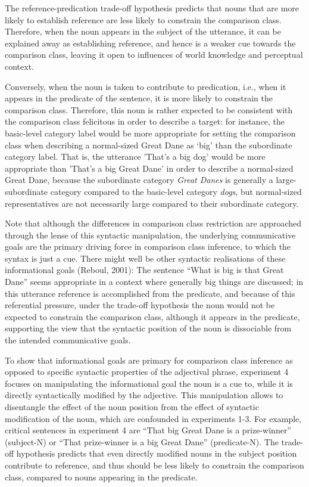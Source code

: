The reference-predication trade-off hypothesis predicts that nouns that are more likely to establish reference are less likely to constrain the comparison class. Therefore, when the noun appears in the subject of the utterance, it can be explained away as establishing reference, and hence is a weaker cue towards the comparison class, leaving it open to influences of world knowledge and perceptual context. 

 Conversely, when the noun is taken to contribute to predication, i.e., when it appears in the predicate of the sentence, it is more likely to constrain the comparison class. Therefore, this noun is rather expected to be consistent with the comparison class felicitous in order to describe a target: for instance, the basic-level category label would be more appropriate for setting the comparison class when describing a normal-sized Great Dane as ‘big’ than the subordinate category label. That is, the utterance 'That's a big dog' would be more appropriate than 'That's a big Great Dane' in order to describe a normal-sized Great Dane, because the subordinate category \emph{Great Danes} is generally a large-subordinate category compared to the basic-level category \emph{dogs}, but normal-sized representatives are not necessarily large compared to their subordinate category. 

Note that although the differences in comparison class restriction are approached through the lense of this syntactic manipulation, the underlying communicative goals are the primary driving force in comparison class inference, to which the syntax is just a cue. 
There might well be other syntactic realisations of these informational goals (Reboul, 2001): The sentence “What is big is that Great Dane” seems appropriate in a context where generally big things are discussed; in this utterance reference is accomplished from the predicate, and because of this referential pressure, under the trade-off hypothesis the noun would not be expected to constrain the comparison class, although it appears in the predicate, supporting the view that the syntactic position of the noun is dissociable from the intended communicative goals.

To show that informational goals are primary for comparison class inference as opposed to specific syntactic properties of the adjectival phrase, experiment 4 focuses on manipulating the informational goal the noun is a cue to, while it is directly syntactically modified by the adjective. This manipulation allows to disentangle the effect of the noun position from the effect of syntactic modification of the noun, which are confounded in experiments 1-3. For example, critical sentences in experiment 4 are “That big Great Dane is a prize-winner” (subject-N) or “That prize-winner is a big Great Dane” (predicate-N). The trade-off hypothesis predicts that even directly modified nouns in the subject position contribute to reference, and thus should be less likely to constrain the comparison class, compared to nouns appearing in the predicate.

